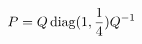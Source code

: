 \documentclass[preview]{standalone}
\begin{document}
\begin{align*}
\special{dvisvgm:raw <g id='unique000'>}P=Q\operatorname{diag}(1,\frac14)Q^{-1}\special{dvisvgm:raw </g>}
\end{align*}
\end{document}
